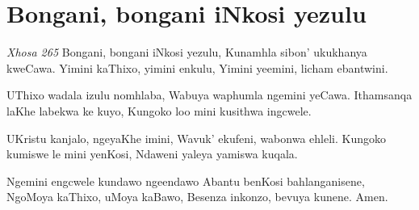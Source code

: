 \starttocol
\chapter{Bongani, bongani iNkosi yezulu}
\nexttocol
\hfill{\it Xhosa 265}
\stoptocol
\starttocol
\startlines
{\sc Bongani}, bongani iNkosi yezulu,
Kunamhla sibon' ukukhanya kweCawa.
Yimini kaThixo, yimini enkulu,
Yimini yeemini, licham ebantwini.

UThixo wadala izulu nomhlaba,
Wabuya waphumla ngemini yeCawa.
Ithamsanqa laKhe labekwa ke kuyo,
Kungoko loo mini kusithwa ingcwele.

UKristu kanjalo, ngeyaKhe imini,
Wavuk' ekufeni, wabonwa ehleli.
Kungoko kumiswe le mini yenKosi,
Ndaweni yaleya yamiswa kuqala.

Ngemini engcwele kundawo ngeendawo
Abantu benKosi bahlanganisene,
NgoMoya kaThixo, uMoya kaBawo,
Besenza inkonzo, bevuya kunene. 
\hfill Amen.
\stoplines
\nexttocol

\stoptocol
